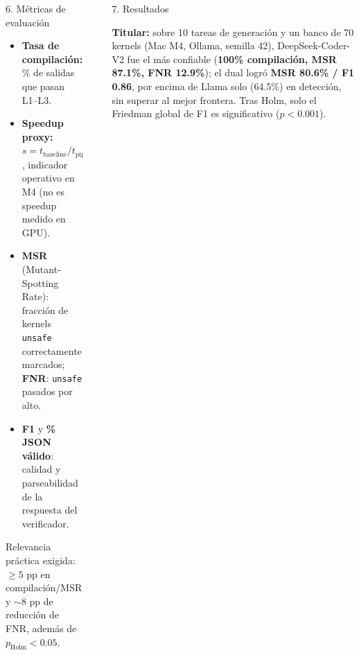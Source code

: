 \documentclass[final]{beamer}
\newlength{\sepwidth}
\newlength{\colwidth}
\newcommand{\separatorcolumn}{\begin{column}{\sepwidth}\end{column}}
\begin{document}
\begin{frame}[t]
\begin{columns}[t]
\begin{column}{\colwidth}
\begin{block}{6. Métricas de evaluación}
    \begin{itemize}
      \item \textbf{Tasa de compilación:} \% de salidas que pasan L1--L3.
      \item \textbf{Speedup proxy:} $s = t_{\text{baseline}}/t_{\text{pipeline}}$,
        indicador operativo en M4 (no es speedup medido en GPU).
      \item \textbf{MSR} (Mutant-Spotting Rate): fracción de kernels
        \texttt{unsafe} correctamente marcados; \textbf{FNR}: \texttt{unsafe}
        pasados por alto.
      \item \textbf{F1} y \textbf{\% JSON válido}: calidad y parseabilidad de la
        respuesta del verificador.
    \end{itemize}

    Relevancia práctica exigida: $\geq 5$ pp en compilación/MSR y $\sim 8$ pp de
    reducción de FNR, además de $p_{\text{Holm}} < 0.05$.

  \end{block}

\end{column}

\separatorcolumn

\begin{column}{\colwidth}

  \begin{block}{7. Resultados}

    \textbf{Titular:} sobre 10 tareas de generación y un banco de 70 kernels
    (Mac M4, Ollama, semilla 42), DeepSeek-Coder-V2 fue el más confiable
    (\textbf{100\% compilación, MSR 87.1\%, FNR 12.9\%}); el dual logró
    \textbf{MSR 80.6\% / F1 0.86}, por encima de Llama solo (64.5\%) en
    detección, sin superar al mejor frontera. Tras Holm, solo el Friedman
    global de F1 es significativo ($p < 0.001$).


\end{block}
\end{column}
\end{columns}
\end{frame}
\end{document}
